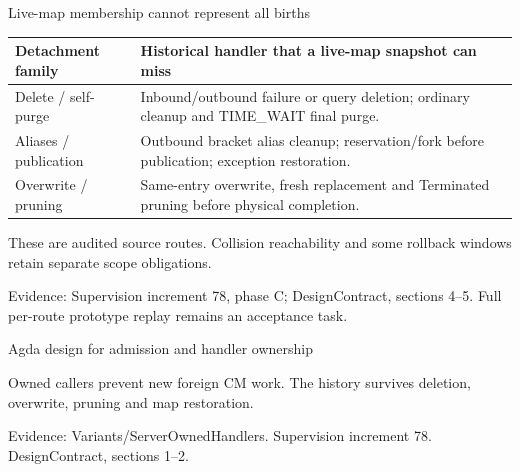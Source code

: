\documentclass[11pt,aspectratio=169]{beamer}
\newcommand{\evidence}[1]{\vfill{\fontsize{7}{8}\selectfont\color{Muted}Evidence: #1\par}}
\begin{document}
\begin{frame}{Live-map membership cannot represent all births}
\small\renewcommand{\arraystretch}{1.2}
\begin{tabularx}{\textwidth}{@{}P{28mm}Y@{}}
\toprule
Detachment family & Historical handler that a live-map snapshot can miss \\ \midrule
Delete / self-purge & Inbound/outbound failure or query deletion; ordinary cleanup and TIME\_WAIT final purge. \\[2mm]
Aliases / publication & Outbound bracket alias cleanup; reservation/fork before publication; exception restoration. \\[2mm]
Overwrite / pruning & Same-entry overwrite, fresh replacement and Terminated pruning before physical completion. \\[2mm]
\bottomrule
\end{tabularx}\par\vspace{3mm}\small These are audited source routes. Collision reachability and some rollback windows retain separate scope obligations.
\evidence{Supervision increment 78, phase C; DesignContract, sections 4--5. Full per-route prototype replay remains an acceptance task.}
\end{frame}

\begin{frame}{Agda design for admission and handler ownership}
\centering
{}
\par\vspace{3mm}\small Owned callers prevent new foreign CM work. The history survives deletion, overwrite, pruning and map restoration.

\evidence{Variants/ServerOwnedHandlers. Supervision increment 78. DesignContract, sections 1--2.}
\end{frame}
\end{document}
